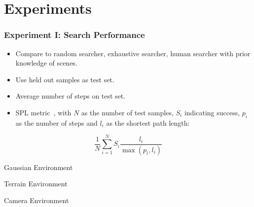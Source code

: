 \section{Experiments}

\begin{frame}
    \frametitle{Experiment I: Search Performance}

    \begin{itemize}
        \item Compare to random searcher, exhaustive searcher, human searcher with prior knowledge of scenes.
        \item Use held out samples as test set.
        \item Average number of steps on test set.
        \item SPL metric~\cite{anderson_evaluation_2018}, with \(N\) as the number of test samples, \(S_i\) indicating success, \(p_i\) as the number of steps and \(l_i\) as the shortest path length:
    \end{itemize}

    \begin{equation}
        \frac{1}{N} \sum_{i=1}^N S_i \frac{l_i}{\max(p_i,l_i)}
    \end{equation}
\end{frame}

\begin{frame}
    \begin{table}
        \centering
        Gaussian Environment\par\vspace{0.5em}
        
    \end{table}
\end{frame}

\begin{frame}
    \begin{table}
        \centering
        Terrain Environment\par\vspace{0.5em}
        
    \end{table}
\end{frame}

\begin{frame}
    \begin{table}
        \centering
        Camera Environment\par\vspace{0.5em}
        
    \end{table}
\end{frame}

